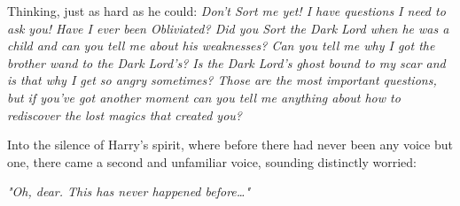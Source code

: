 Thinking, just as hard as he could: \emph{Don't Sort me yet! I have questions I 
need to ask you! Have I ever been Obliviated? Did you Sort the Dark Lord when 
he was a child and can you tell me about his weaknesses? Can you tell me why I 
got the brother wand to the Dark Lord's? Is the Dark Lord's ghost bound to my 
scar and is that why I get so angry sometimes? Those are the most important 
questions, but if you've got another moment can you tell me anything about how 
to rediscover the lost magics that created you?}

Into the silence of Harry's spirit, where before there had never been any voice 
but one, there came a second and unfamiliar voice, sounding distinctly worried:

\emph{"Oh, dear. This has never happened before{\ldots}"}